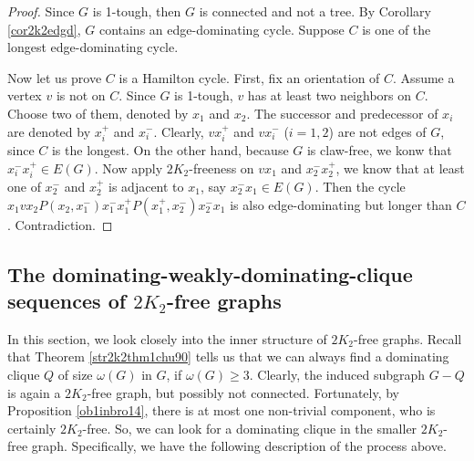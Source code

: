 \documentclass[12pt]{report}
\begin{document}
\begin{proof}
Since $G$ is 1-tough, then $G$ is connected and not a tree.
By Corollary \ref{cor2k2edgd}, $G$ contains an edge-dominating cycle. Suppose $C$ is one of the longest edge-dominating cycle. 

Now let us prove $C$ is a Hamilton cycle. First, fix an orientation of $C$. Assume a vertex $v$ is not on $C$. Since $G$ is 1-tough, $v$ has at least two neighbors on $C$. Choose two of them, denoted by $x_1$ and $x_2$. The successor and predecessor of $x_i$ are denoted by $x_i^+$ and $x_i^-$. Clearly, $vx_i^+$ and $vx_i^-$ ($i=1,2$) are not edges of $G$, since $C$ is the longest. On the other hand, because $G$ is claw-free, we konw that$x_i^-x_i^+\in E(G)$. Now apply $2K_2$-freeness on $vx_1$ and $x_2^-x_2^+$, we know that at least one of $x_2^-$ and $x_2^+$ is adjacent to $x_1$, say $x_2^-x_1\in E(G)$. Then the cycle $x_1vx_2P(x_2,x_1^-)x_1^-x_1^+P(x_1^+,x_2^-)x_2^-x_1$ is also edge-dominating but longer than $C$. Contradiction.
\end{proof}







\subsection{The dominating-weakly-dominating-clique sequences of $2K_2$-free graphs}
In this section, we look closely into the inner structure of $2K_2$-free graphs.
Recall that Theorem \ref{str2k2thm1chu90} tells us that we can always find a dominating clique $Q$ of size $\omega(G)$ in $G$, if $\omega(G)\ge3$.
Clearly, the induced subgraph $G-Q$ is again a $2K_2$-free graph, but possibly not connected. Fortunately, by Proposition \ref{ob1inbro14}, there is at most one non-trivial component, who is certainly $2K_2$-free. So, we can look for a dominating clique in the smaller $2K_2$-free graph. Specifically, we have the following description of the process above.
\end{document}
